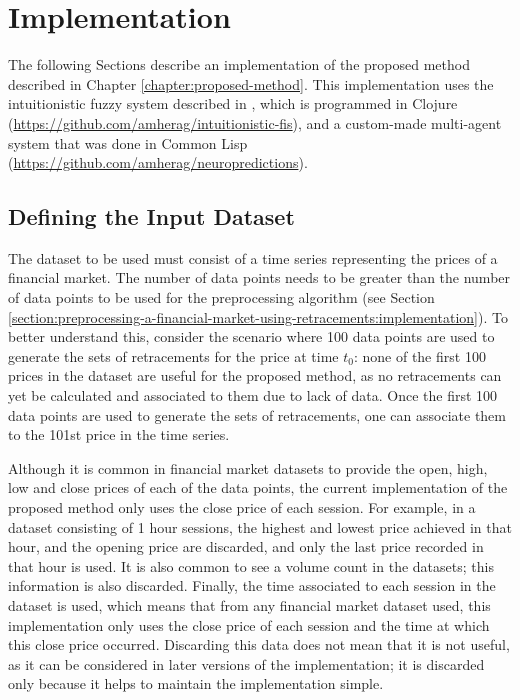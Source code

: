 \chapter{Implementation}
\label{chapter:implementation}

The following Sections describe an implementation of the proposed method
described in Chapter \ref{chapter:proposed-method}. This implementation uses the
intuitionistic fuzzy system described in \cite{Hernandez-Aguila2017}, which is
programmed in Clojure (\url{https://github.com/amherag/intuitionistic-fis}), and a
custom-made multi-agent system that was done in Common Lisp
(\url{https://github.com/amherag/neuropredictions}).

\section{Defining the Input Dataset}
\label{section:defining-the-input-dataset}

The dataset to be used must consist of a time series representing the prices
of a financial market. The number of data points needs to be greater than the
number of data points to be used for the preprocessing algorithm (see Section
\ref{section:preprocessing-a-financial-market-using-retracements:implementation}). To
better understand this, consider the scenario where 100 data points are used to
generate the sets of retracements for the price at time $t_0$: none of the first
100 prices in the dataset are useful for the proposed method, as no retracements
can yet be calculated and associated to them due to lack of data. Once the first
100 data points are used to generate the sets of retracements, one can associate
them to the 101st price in the time series.

Although it is common in financial market datasets to provide the open, high,
low and close prices of each of the data points, the current implementation of the
proposed method only uses the close price of each session. For example, in a
dataset consisting of 1 hour sessions, the highest and lowest price achieved in
that hour, and the opening price are discarded, and only the last price recorded
in that hour is used. It is also common to see a volume count in the datasets;
this information is also discarded. Finally, the time associated to each session
in the dataset is used, which means that from any financial market dataset used,
this implementation only uses the close price of each session and the time at
which this close price occurred. Discarding this data does not mean that it is
not useful, as it can be considered in later versions of the implementation;
it is discarded only because it helps to maintain the implementation simple.

